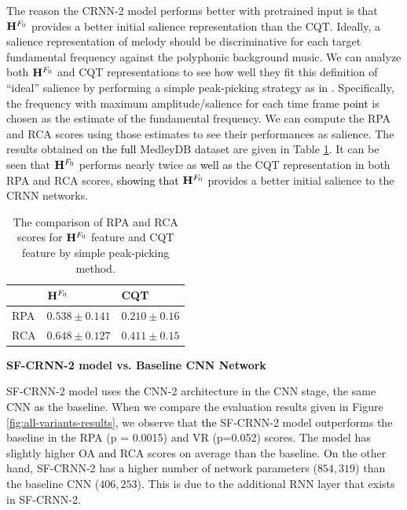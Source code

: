\documentclass{article}
\newcommand{\gpcor}[2]{{\textcolor{black}{#2}}}
\newcommand{\se}[1]{{\textcolor{black}{#1}}}
\newcommand{\jb}[1]{{\textcolor{black}{#1}}}
\newcommand{\jbcor}[2]{{\textcolor{black}{#2}}}
\begin{document}
The reason the CRNN-2 model performs better with pretrained input is that $\mathbf{H}^{F_{0}}$ provides a better initial salience representation than the CQT. Ideally, a salience representation of melody should be discriminative for each target fundamental frequency against the polyphonic background music. We can analyze both $\mathbf{H}^{F_{0}}$ and CQT representations to see how well they fit this definition of ``ideal'' salience by performing a simple peak-picking strategy as in \cite{bittner2017_deep}. Specifically, the frequency with maximum amplitude/salience for each time frame \se{point} is chosen as the estimate of the fundamental frequency. We can compute the RPA and RCA scores using those estimates to see their performances as salience. The results
obtained on \jbcor{all}{the full} MedleyDB dataset are given in Table \ref{tab:HF0-CQT-analysis}. 
It can be seen that $\mathbf{H}^{F_{0}}$ performs nearly twice 
as \jbcor{better than}{well as} the CQT representation in both RPA and RCA scores, \jbcor{that shows}{showing that} $\mathbf{H}^{F_{0}}$ provides a better initial salience to the CRNN networks.\\     
\begin{table}
 \begin{center}
 \begin{tabular}{|l|l|l|}
  \hline
  & $\mathbf{H}^{F_{0}}$  & CQT\\
  \hline
  RPA   & $0.538 \pm 0.141$  & $0.210 \pm 0.16$ \\
  \hline
  RCA   & $0.648 \pm 0.127$  & $0.411 \pm 0.15$ \\
  \hline
  \end{tabular}
 \end{center}
 \caption{The comparison of RPA and RCA scores for $\mathbf{H}^{F_{0}}$ feature and CQT feature by simple peak-picking method.}
 \label{tab:HF0-CQT-analysis}
\end{table}

\vspace{-0.25cm}
\hspace{-0.43cm}\textbf{SF-CRNN-2 model vs. Baseline CNN Network}

\hspace{-0.45cm}\jb{The} SF-CRNN-2 model uses \jb{the} CNN-2 architecture in the CNN stage, \jbcor{that is}{} the same CNN \jbcor{network}{} \gpcor{with}{as} the baseline.
When we compare the evaluation results given in Figure \ref{fig:all-variants-results}, we observe that \jb{the} SF-CRNN-2 model outperforms the baseline in the RPA (p = 0.0015) and VR (p=0.052) scores. 
The model has slightly higher OA \jb{and} RCA scores on average than the baseline. 
On the other hand, SF-CRNN-2 has \jb{a} higher number of network parameters ($854,319$) than the baseline CNN ($406,253$). 
This is due to the additional RNN layer that exists in SF-CRNN-2.
\end{document}
